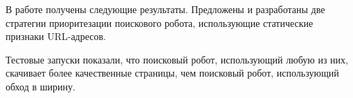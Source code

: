 \startconclusionpage

В работе получены следующие результаты. Предложены и разработаны две стратегии приоритезации поискового робота, использующие статические признаки URL-адресов. 

Тестовые запуски показали, что поисковый робот, использующий любую из них, скачивает более качественные страницы, чем поисковый робот, использующий обход в ширину.